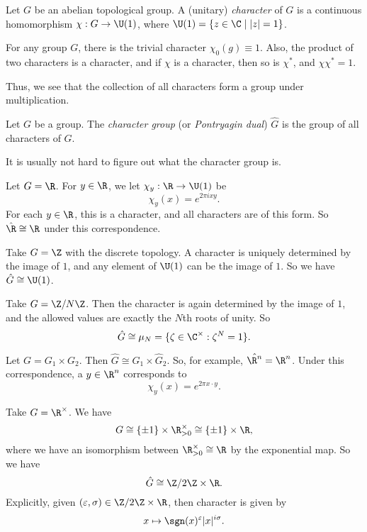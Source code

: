 \documentclass[a4paper]{article}
\begin{document}
\begin{defi}[Character]
  Let $G$ be an abelian topological group. A (unitary) \emph{character} of $G$ is a continuous homomorphism $\chi: G \to \U(1)$, where $\U(1) = \{z \in \C \mid |z| = 1\}$.
\end{defi}

\begin{eg}
  For any group $G$, there is the trivial character $\chi_0(g) \equiv 1$. Also, the product of two characters is a character, and if $\chi$ is a character, then so is $\chi^*$, and $\chi \chi^* = 1$.
\end{eg}

Thus, we see that the collection of all characters form a group under multiplication.
\begin{defi}
  Let $G$ be a group. The \emph{character group} (or \emph{Pontryagin dual}) $\hat{G}$ is the group of all characters of $G$.
\end{defi}

It is usually not hard to figure out what the character group is.
\begin{eg}
  Let $G = \R$. For $y \in \R$, we let $\chi_y: \R \to \U(1)$ be
  \[
    \chi_y(x) = e^{2\pi i xy}.
  \]
  For each $y \in \R$, this is a character, and all characters are of this form. So $\hat{\R} \cong \R$ under this correspondence.
\end{eg}

\begin{eg}
  Take $G = \Z$ with the discrete topology. A character is uniquely determined by the image of $1$, and any element of $\U(1)$ can be the image of $1$. So we have $\hat{G} \cong \U(1)$.
\end{eg}

\begin{eg}
  Take $G = \Z/N\Z$. Then the character is again determined by the image of $1$, and the allowed values are exactly the $N$th roots of unity. So
  \[
    \hat{G} \cong \mu_N = \{\zeta \in \C^\times: \zeta^N = 1\}.
  \]
\end{eg}

\begin{eg}
  Let $G = G_1 \times G_2$. Then $\hat{G} \cong \hat{G}_1 \times \hat{G}_2$. So, for example, $\hat{\R^n} = \R^n$. Under this correspondence, a $y \in \R^n$ corresponds to
  \[
    \chi_y(x) = e^{2\pi x\cdot y}.
  \]
\end{eg}

\begin{eg}
  Take $G = \R^\times$. We have
  \[
    G \cong \{\pm 1\} \times \R^\times_{>0} \cong \{\pm 1\} \times \R,
  \]
  where we have an isomorphism between $\R^{\times}_{> 0} \cong \R$ by the exponential map. So we have
  \[
    \hat{G} \cong \Z/2\Z \times \R.
  \]
  Explicitly, given $(\varepsilon, \sigma) \in \Z/2\Z \times \R$, then character is given by
  \[
    x \mapsto \sgn(x)^\varepsilon |x|^{i\sigma}.
  \]
\end{eg}
\end{document}
